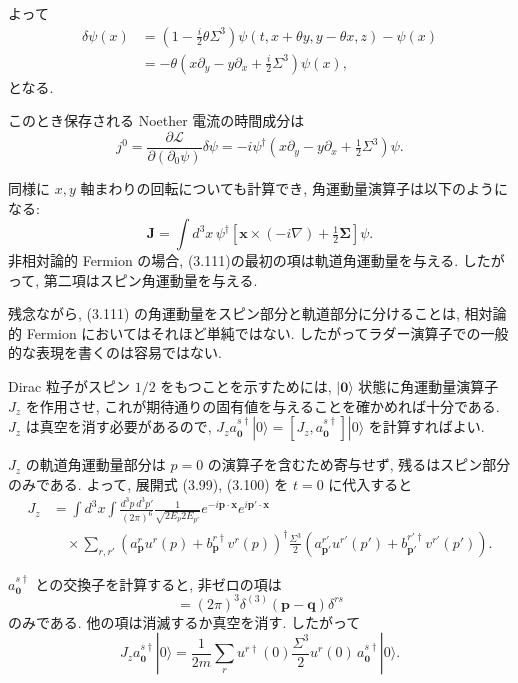 \documentclass[a4paper,12pt]{article}
\begin{document}
よって
\begin{align}
\delta \psi(x) &= \left(1 - \frac{i}{2}\theta \Sigma^3\right)\psi(t, x+\theta y, y-\theta x, z) - \psi(x) \\
&= -\theta (x\partial_y - y\partial_x + \tfrac{i}{2}\Sigma^3)\psi(x),
\end{align}
となる.  

このとき保存される Noether 電流の時間成分は
\begin{equation}
j^0 = \frac{\partial \mathcal{L}}{\partial (\partial_0 \psi)} \delta \psi 
= - i \psi^\dagger \left( x\partial_y - y\partial_x + \tfrac{1}{2}\Sigma^3 \right)\psi.
\end{equation}

同様に $x, y$ 軸まわりの回転についても計算でき, 角運動量演算子は以下のようになる:
\begin{equation}
\mathbf{J} = \int d^3x \, \psi^\dagger \left[ \mathbf{x}\times(-i\nabla) + \tfrac{1}{2}\boldsymbol{\Sigma} \right]\psi.
\tag{3.111}
\end{equation}
非相対論的 Fermion の場合, (3.111)の最初の項は軌道角運動量を与える. したがって, 第二項はスピン角運動量を与える.

残念ながら, (3.111) の角運動量をスピン部分と軌道部分に分けることは,
相対論的 Fermion においてはそれほど単純ではない.  
したがってラダー演算子での一般的な表現を書くのは容易ではない.  

Dirac 粒子がスピン $1/2$ をもつことを示すためには,
$|\mathbf{0}\rangle$ 状態に角運動量演算子 $J_z$ を作用させ, 
これが期待通りの固有値を与えることを確かめれば十分である.  
$J_z$ は真空を消す必要があるので, $J_z a^{s\dagger}_{\mathbf{0}}|0\rangle = [J_z, a^{s\dagger}_{\mathbf{0}}]|0\rangle$ を計算すればよい.  

$J_z$ の軌道角運動量部分は $p=0$ の演算子を含むため寄与せず, 
残るはスピン部分のみである. よって, 展開式 (3.99), (3.100) を $t=0$ に代入すると
\begin{align}
J_z &= \int d^3x \int \frac{d^3p\, d^3p'}{(2\pi)^6}\frac{1}{\sqrt{2E_p 2E_{p'}}} 
e^{-i\mathbf{p}\cdot \mathbf{x}} e^{i\mathbf{p'}\cdot \mathbf{x}} \\
&\quad \times \sum_{r,r'} \left( a^r_{\mathbf{p}} u^r(p) + b^{r\dagger}_{\mathbf{p}} v^r(p)\right)^\dagger 
\frac{\Sigma^3}{2} \left( a^{r'}_{\mathbf{p'}} u^{r'}(p') + b^{r'\dagger}_{\mathbf{p'}} v^{r'}(p') \right).
\end{align}

$a^{s\dagger}_{\mathbf{0}}$ との交換子を計算すると, 非ゼロの項は
\begin{equation}
[a^r_{\mathbf{p}}, a^{s\dagger}_{\mathbf{q}}] = (2\pi)^3\delta^{(3)}(\mathbf{p}-\mathbf{q})\delta^{rs}
\end{equation}
のみである. 他の項は消滅するか真空を消す. したがって
\begin{equation}
J_z a^{s\dagger}_{\mathbf{0}}|0\rangle = \frac{1}{2m} \sum_r u^{r\dagger}(0)\frac{\Sigma^3}{2}u^r(0)\, a^{s\dagger}_{\mathbf{0}}|0\rangle.
\end{equation}
\end{document}
